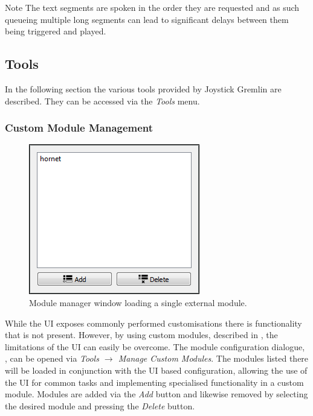 \documentclass[a4, 10pt]{article}
\newcommand{\JG}{Joystick Gremlin}
\begin{document}
\vspace{1em}
\begin{bclogo}[
    couleur=yellow!40,
    couleurBord=orange!80,
    couleurBarre=orange!80,
    arrondi=0.1,
    logo=\bcinfo
]{Note}
    The text segments are spoken in the order they are requested and as
    such queueing multiple long segments can lead to significant delays
    between them being triggered and played.
\end{bclogo}

\FloatBarrier


\subsection{Tools}

In the following section the various tools provided by \JG{} are
described. They can be accessed via the \emph{Tools} menu.

\subsubsection{Custom Module Management}

\begin{figure}[bt]
    \centering

    \includegraphics[width=0.3\linewidth]{images/module_manager}
    \caption{Module manager window loading a single external module.}
    \label{fig:custom_module}
\end{figure}

While the UI exposes commonly performed customisations there is
functionality that is not present. However, by using custom modules,
described in , the limitations of the UI can
easily be overcome. The module configuration dialogue,
, can be opened via \emph{Tools $\rightarrow$
Manage Custom Modules}. The modules listed there will be loaded in
conjunction with the UI based configuration, allowing the use of the UI
for common tasks and implementing specialised functionality in a custom
module. Modules are added via the \emph{Add} button and likewise removed
by selecting the desired module and pressing the \emph{Delete} button.
\end{document}
